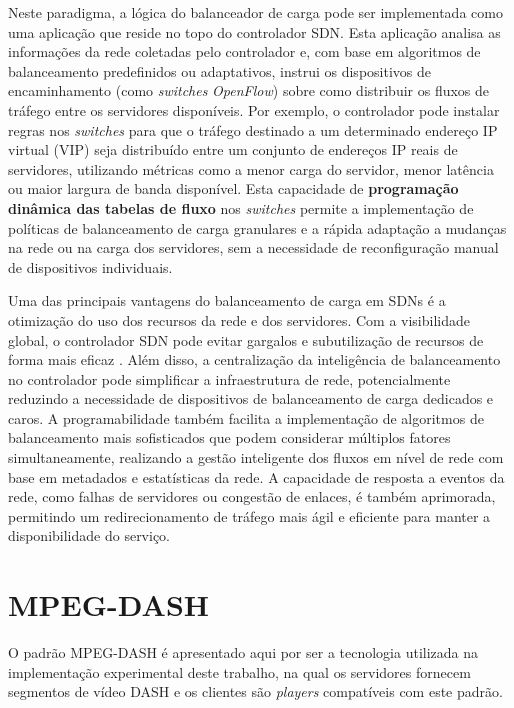 Neste paradigma, a lógica do balanceador de carga pode ser implementada como uma aplicação que reside no topo do controlador SDN. Esta aplicação analisa as informações da rede coletadas pelo controlador e, com base em algoritmos de balanceamento predefinidos ou adaptativos, instrui os dispositivos de encaminhamento (como \textit{switches} \textit{OpenFlow}) sobre como distribuir os fluxos de tráfego entre os servidores disponíveis. Por exemplo, o controlador pode instalar regras nos \textit{switches} para que o tráfego destinado a um determinado endereço IP virtual (VIP) seja distribuído entre um conjunto de endereços IP reais de servidores, utilizando métricas como a menor carga do servidor, menor latência ou maior largura de banda disponível. Esta capacidade de \textbf{programação dinâmica das tabelas de fluxo} nos \textit{switches} permite a implementação de políticas de balanceamento de carga granulares e a rápida adaptação a mudanças na rede ou na carga dos servidores, sem a necessidade de reconfiguração manual de dispositivos individuais.

Uma das principais vantagens do balanceamento de carga em SDNs é a otimização do uso dos recursos da rede e dos servidores. Com a visibilidade global, o controlador SDN pode evitar gargalos e subutilização de recursos de forma mais eficaz \cite{Blial2016}. Além disso, a centralização da inteligência de balanceamento no controlador pode simplificar a infraestrutura de rede, potencialmente reduzindo a necessidade de dispositivos de balanceamento de carga dedicados e caros. A programabilidade também facilita a implementação de algoritmos de balanceamento mais sofisticados que podem considerar múltiplos fatores simultaneamente, realizando a gestão inteligente dos fluxos em nível de rede com base em metadados e estatísticas da rede. A capacidade de resposta a eventos da rede, como falhas de servidores ou congestão de enlaces, é também aprimorada, permitindo um redirecionamento de tráfego mais ágil e eficiente para manter a disponibilidade do serviço.


\section{MPEG-DASH}

O padrão MPEG-DASH é apresentado aqui por ser a tecnologia utilizada na implementação experimental deste trabalho, na qual os servidores fornecem segmentos de vídeo DASH e os clientes são \textit{players} compatíveis com este padrão.

